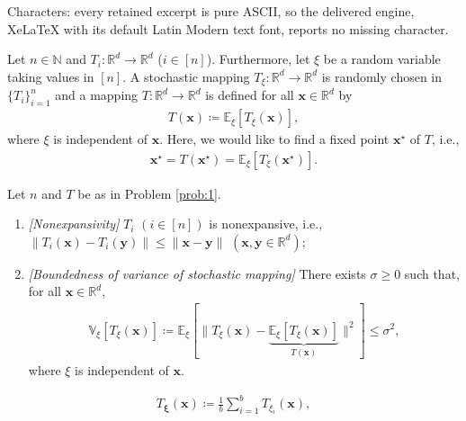 \documentclass[10pt,a4paper]{amsart}
\begin{document}
Characters: every retained excerpt is pure ASCII, so the delivered engine, XeLaTeX with its default Latin Modern text font, reports no missing character.
\begin{problem}\label{prob:1}
Let $n \in \mathbb{N}$ and $T_i \colon \mathbb{R}^d \to \mathbb{R}^d$ ($i\in [n]$). Furthermore, let $\xi$ be a random variable taking values in $[n]$. A stochastic mapping $T_\xi \colon \mathbb{R}^d \to \mathbb{R}^d$ is randomly chosen in $\{ T_i \}_{i=1}^{n}$ and a mapping $T \colon \mathbb{R}^d \to \mathbb{R}^d$ is defined for all $\bm{x} \in \mathbb{R}^d$ by 
\begin{align}\label{true_t}
T (\bm{x}) \coloneqq \mathbb{E}_\xi [T_\xi (\bm{x})],
\end{align}
where $\xi$ is independent of $\bm{x}$.
Here, we would like to find a fixed point $\bm{x}^\star$ of $T$, i.e., 
\begin{align*}
\bm{x}^\star = T (\bm{x}^\star) = \mathbb{E}_\xi [T_\xi (\bm{x}^\star)].
\end{align*} 
\end{problem}

\begin{assumption}\label{assum:1}
Let $n$ and $T$ be as in Problem \ref{prob:1}.
\begin{enumerate}
\item[{\em (A1)}] {\em [Nonexpansivity]} $T_i$ $(i\in [n])$ is nonexpansive, i.e., $\|T_i (\bm{x}) - T_i (\bm{y})\| \leq \|\bm{x} - \bm{y}\|$ $(\bm{x}, \bm{y} \in \mathbb{R}^d)$;
\item[{\em (A2)}] {\em [Boundedness of variance of stochastic mapping]} There exists $\sigma \geq 0$ such that, for all $\bm{x} \in \mathbb{R}^{d}$, 
\begin{align*}
\mathbb{V}_{\xi}[T_{\xi}(\bm{x})] \coloneqq \mathbb{E}_{\xi}[\| T_{\xi}(\bm{x}) - \underbrace{\mathbb{E}_{\xi}[T_{\xi}(\bm{x})]}_{T (\bm{x})} \|^2] \leq \sigma^{2},
\end{align*}
where $\xi$ is independent of $\bm{x}$.
\end{enumerate}
\end{assumption}

\begin{align}\label{mini_batch}
T_{\bm{\xi}}(\bm{x}) \coloneqq 
\frac{1}{b} \sum_{i=1}^b T_{\xi_{i}}(\bm{x}),
\end{align} 
\end{document}
